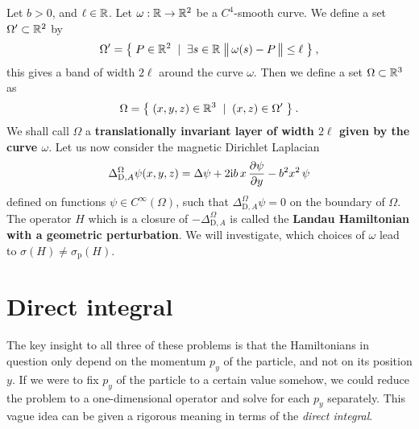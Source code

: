 \begin{defn}
    \label{defn-perturb-geom}
    Let $b>0$, and $\ell \in \mathbb{R}$. Let $\omega: \mathbb{R} \to \mathbb{R}^2$ be a $C^4$-smooth curve. We define a set $\Omega' \subset \mathbb{R}^2$ by
    \begin{equation*}
        \Omega' = \big\{\;
            P \in \mathbb{R}^2
        \;\;|\;\;
            \exists s \in \mathbb{R} \;
            \big\lVert  \, \omega(s) - P \,  \big\rVert \leq \ell
        \;\big\}
        \: ,
    \end{equation*}
    this gives a band of width $2\ell$ around the curve $\omega$. \!Then we define a set $\Omega \subset \mathbb{R}^3$ as
    \begin{equation*}
        \Omega = \big\{\;
            (x, y, z) \in \mathbb{R}^3
        \;\;|\;\;
            (x, z) \in \Omega'
        \;\big\} \: .
    \end{equation*}
    We shall call $\Omega$ a \textbf{translationally invariant layer of width $2\ell$ given by the curve $\omega$}. Let us now consider the magnetic Dirichlet Laplacian
    \begin{align*}
        \Delta^\Omega_{\mathrm{D}, A} \psi(x,y,z)
        = \Delta \psi + 2\mathrm{i} b \, x \, \frac{\partial \psi}{\partial y} - b^2 x^2 \, \psi
    \end{align*}
    defined on functions $\psi \in C^\infty(\Omega)$, such that $\Delta^\Omega_{\mathrm{D}, A} \psi = 0$ on the boundary of $\Omega$. The operator $H$ which is a closure of $-\Delta^\Omega_{\mathrm{D}, A}$ is called the \textbf{Landau Hamiltonian with a geometric perturbation}. We will investigate, which choices of $\omega$ lead to $\sigma(H) \neq \sigma_{\mathrm{p}}(H)$.
\end{defn}



\section{Direct integral}
The key insight to all three of these problems is that the Hamiltonians in question only depend on the momentum $p_y$ of the particle, and not on its position $y$. If we were to fix $p_y$ of the particle to a certain value somehow, we could reduce the problem to a one-dimensional operator and solve for each $p_y$ separately. This vague idea can be given a rigorous meaning in terms of the \textit{direct integral}.

